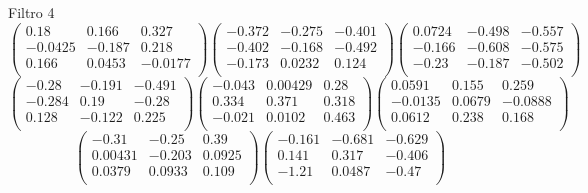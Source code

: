 Filtro 4
{ \small
\[
\begin{pmatrix}
  0.18 & 0.166 & 0.327 \\
  -0.0425 & -0.187 & 0.218 \\
  0.166 & 0.0453 & -0.0177 \\
\end{pmatrix}
\begin{pmatrix}
  -0.372 & -0.275 & -0.401 \\
  -0.402 & -0.168 & -0.492 \\
  -0.173 & 0.0232 & 0.124 \\
\end{pmatrix}
\begin{pmatrix}
  0.0724 & -0.498 & -0.557 \\
  -0.166 & -0.608 & -0.575 \\
  -0.23 & -0.187 & -0.502 \\
\end{pmatrix}
\]
\[
\begin{pmatrix}
  -0.28 & -0.191 & -0.491 \\
  -0.284 & 0.19 & -0.28 \\
  0.128 & -0.122 & 0.225 \\
\end{pmatrix}
\begin{pmatrix}
  -0.043 & 0.00429 & 0.28 \\
  0.334 & 0.371 & 0.318 \\
  -0.021 & 0.0102 & 0.463 \\
\end{pmatrix}
\begin{pmatrix}
  0.0591 & 0.155 & 0.259 \\
  -0.0135 & 0.0679 & -0.0888 \\
  0.0612 & 0.238 & 0.168 \\
\end{pmatrix}
\]
\[
\begin{pmatrix}
  -0.31 & -0.25 & 0.39 \\
  0.00431 & -0.203 & 0.0925 \\
  0.0379 & 0.0933 & 0.109 \\
\end{pmatrix}
\begin{pmatrix}
  -0.161 & -0.681 & -0.629 \\
  0.141 & 0.317 & -0.406 \\
  -1.21 & 0.0487 & -0.47 \\
\end{pmatrix}
\]
}

